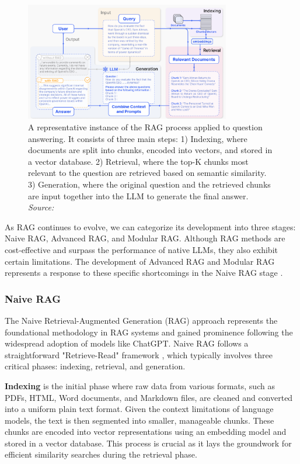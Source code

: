 \begin{figure}[h]
    \centering
    \includegraphics[width=0.8\textwidth]{images/llms/rag-strategies.png}
    \caption{A representative instance of the RAG process applied to question answering. It consists of three main steps: 1) Indexing, where documents are split into chunks, encoded into vectors, and stored in a vector database. 2) Retrieval, where the top-K chunks most relevant to the question are retrieved based on semantic similarity. 3) Generation, where the original question and the retrieved chunks are input together into the LLM to generate the final answer. \textit{Source:} \cite{gao2023retrieval}}
    \label{fig:rag_example}
\end{figure}

As RAG continues to evolve, we can categorize its development into three stages: Naive RAG, Advanced RAG, and Modular RAG. Although RAG methods are cost-effective and surpass the performance of native LLMs, they also exhibit certain limitations. The development of Advanced RAG and Modular RAG represents a response to these specific shortcomings in the Naive RAG stage \cite{gao2023retrieval}.

\subsubsection{Naive RAG}

The Naive Retrieval-Augmented Generation (RAG) approach represents the foundational methodology in RAG systems and gained prominence following the widespread adoption of models like ChatGPT. Naive RAG follows a straightforward "Retrieve-Read" framework \cite{ma2023query}, which typically involves three critical phases: indexing, retrieval, and generation.

\textbf{Indexing} is the initial phase where raw data from various formats, such as PDFs, HTML, Word documents, and Markdown files, are cleaned and converted into a uniform plain text format. Given the context limitations of language models, the text is then segmented into smaller, manageable chunks. These chunks are encoded into vector representations using an embedding model and stored in a vector database. This process is crucial as it lays the groundwork for efficient similarity searches during the retrieval phase.

